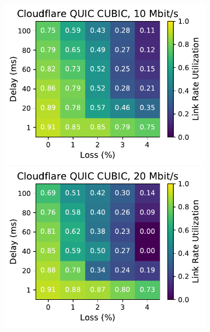 \begin{figure}[ht]
\begin{subfigure}[b]{0.22\linewidth}
        \includegraphics[width=\linewidth,trim={0 0 2cm 0},clip]{splitting-paper/figures/heatmaps/heatmap_quiche_cubic_10mbps.pdf}
        \includegraphics[width=\linewidth,trim={0 0 2cm 0},clip]{splitting-paper/figures/heatmaps/heatmap_quiche_cubic_20mbps.pdf}

\end{subfigure}
\end{figure}
